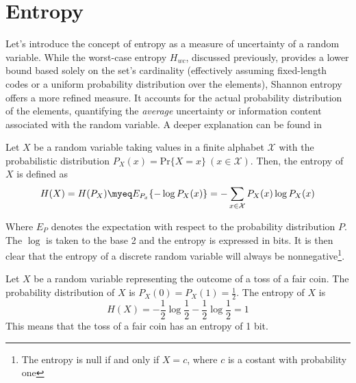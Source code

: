 \section{Entropy} \label{sec:shannon_entropy}

Let's introduce the concept of entropy as a measure of uncertainty of a random variable. While the worst-case entropy $H_{wc}$, discussed previously, provides a lower bound based solely on the set's cardinality (effectively assuming fixed-length codes or a uniform probability distribution over the elements), Shannon entropy offers a more refined measure. It accounts for the actual probability distribution of the elements, quantifying the \emph{average} uncertainty or information content associated with the random variable. A deeper explanation can be found in \cite{han2002mathematics,navarro2016compact,ElementsofInformationTheory}

\begin{definition}\label{def:entropy}
    Let $X$ be a random variable taking values in a finite alphabet $\mathcal{X}$ with the probabilistic distribution $P_X(x)= \text{Pr}\{X=x\}~(x\in\mathcal{X})$. Then, the entropy of $X$ is defined as
    \begin{equation}
        H(X) = H(P_X) \myeq E_{P_x} \{-\log P_X(x)\} = -\sum_{x\in\mathcal{X}} P_X(x)\log P_X(x)
    \end{equation}
\end{definition}
\noindent Where $E_P$ denotes the expectation with respect to the probability distribution $P$. The $\log$ is taken to the base 2 and the entropy is expressed in bits. It is then clear that the entropy of a discrete random variable will always be nonnegative\footnote{The entropy is null if and only if $X = c$, where $c$ is a costant with probability one}. \\



\begin{example}
    Let $X$ be a random variable representing the outcome of a toss of a fair coin. The probability distribution of $X$ is $P_X(0) = P_X(1) = \frac{1}{2}$. The entropy of $X$ is
    \begin{equation}
        H(X) = -\frac{1}{2}\log\frac{1}{2} - \frac{1}{2}\log\frac{1}{2} = 1
    \end{equation}
    This means that the toss of a fair coin has an entropy of 1 bit.
\end{example}

